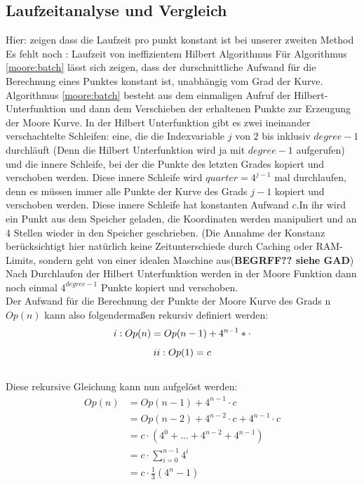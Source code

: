 \documentclass[course=erap]{aspdoc}
\newcommand{\uproman}[1]{\uppercase\expandafter{\romannumeral#1}}
\begin{document}
\subsection{Laufzeitanalyse und Vergleich}
Hier: zeigen dass die Laufzeit pro punkt konstant ist bei unserer zweiten Method
\\Es fehlt noch : Laufzeit von ineffizientem Hilbert Algorithmus
Für Algorithmus \ref{moore:batch} lässt sich zeigen, dass der durschnittliche Aufwand für die Berechnung eines Punktes konstant ist, unabhängig vom Grad der Kurve. \\
Algorithmus \ref{moore:batch} besteht aus dem einmaligen Aufruf der Hilbert-Unterfunktion und dann dem Verschieben der erhaltenen Punkte zur Erzeugung der Moore Kurve. In der Hilbert Unterfunktion gibt es zwei ineinander verschachtelte Schleifen: eine, die die Indexvariable $j$ von $2$ bis inklusiv  $degree -1$ durchläuft (Denn die Hilbert Unterfunktion wird ja mit $degree-1$ aufgerufen) und die innere Schleife, bei der die Punkte des letzten Grades kopiert und verschoben werden. Diese innere Schleife wird $quarter = 4^{j-1}$ mal durchlaufen, denn es müssen immer alle Punkte der Kurve des Grads $j-1$ kopiert und verschoben werden. Diese innere Schleife hat konstanten Aufwand $c$.In ihr wird ein Punkt aus dem Speicher  geladen, die Koordinaten werden manipuliert und an 4 Stellen wieder in den Speicher geschrieben. (Die Annahme der Konstanz berücksichtigt hier natürlich keine Zeitunterschiede durch Caching oder RAM-Limits, sondern geht von einer idealen Maschine aus(\textbf{BEGRFF?? siehe GAD})
Nach Durchlaufen der Hilbert Unterfunktion werden in der Moore Funktion dann noch einmal  $4^{degree-1}$ Punkte kopiert und verschoben. \\ Der Aufwand für die Berechnung der Punkte der Moore Kurve des Grads n $Op(n)$ kann also folgendermaßen rekursiv definiert werden: \ \\
\[\uproman{1}: Op(n) = Op(n-1) + 4^{n-1}*\cdot\]
\[\uproman{2}: Op(1) = c\] \ \\ 
Diese rekursive Gleichung kann nun aufgelöst werden:  \ \\ 
\begin{align*}
  Op(n) &= Op(n-1) + 4^{n-1}\cdot c\\
    &= Op(n-2) + 4^{n-2}\cdot c + 4^{n-1}\cdot c \\
    &= c\cdot(4^{0} + ... + 4^{n-2} + 4^{n-1}) \\
    &= c\cdot\sum_{i=0}^{n-1} 4^{i}\\
    &= c\cdot\frac{1}{3}(4^n-1)\\
\end{align*}
\end{document}
